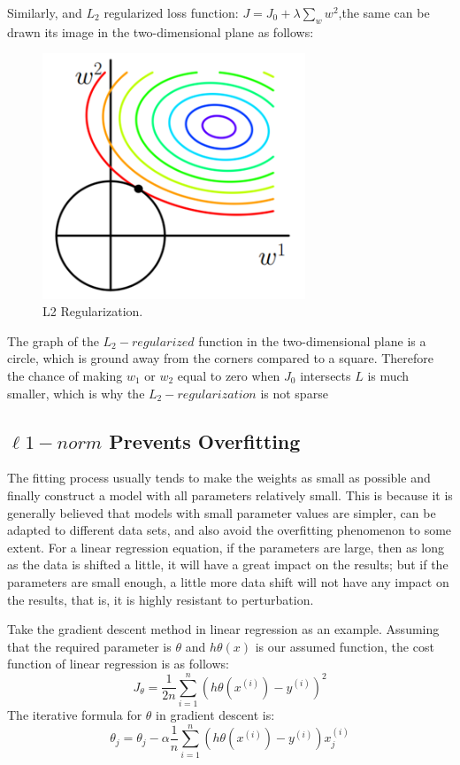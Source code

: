 Similarly, and $L_{2}$ regularized loss function: $J=J_{0}+\lambda \sum_{w} w^{2}$,the same can be drawn its image in the two-dimensional plane as follows:
\begin{figure}[!htbp]
	\centering
	\includegraphics[width = 0.7\textwidth]{figures_ning/l2.png}
	\caption[L2 Regularization]
	{ L2 Regularization.}
	\label{fig:l2}
\end{figure}

The graph of the $L_{2}-regularized$ function in the two-dimensional plane is a circle, which is ground away from the corners compared to a square. Therefore the chance of making $w_{1}$ or $w_{2}$ equal to zero when $J_{0}$ intersects $L$ is much smaller, which is why the $L_{2}-regularization$ is not sparse

\subsection{$\ell 1-n o r m$ Prevents Overfitting}

The fitting process usually tends to make the weights as small as possible and finally construct a model with all parameters relatively small. This is because it is generally believed that models with small parameter values are simpler, can be adapted to different data sets, and also avoid the overfitting phenomenon to some extent. For a linear regression equation, if the parameters are large, then as long as the data is shifted a little, it will have a great impact on the results; but if the parameters are small enough, a little more data shift will not have any impact on the results, that is, it is highly resistant to perturbation.

Take the gradient descent method in linear regression as an example. Assuming that the required parameter is $\theta$ and  $h \theta(x)$ is our assumed function, the cost function of linear regression is as follows:
$$
J_{\theta}=\frac{1}{2 n} \sum_{i=1}^{n}\left(h \theta\left(x^{(i)}\right)-y^{(i)}\right)^{2}
$$
The iterative formula for $\theta$ in gradient descent is:
$$
\theta_{j}=\theta_{j}-\alpha \frac{1}{n} \sum_{i=1}^{n}\left(h \theta\left(x^{(i)}\right)-y^{(i)}\right) x_{j}^{(i)}
$$

